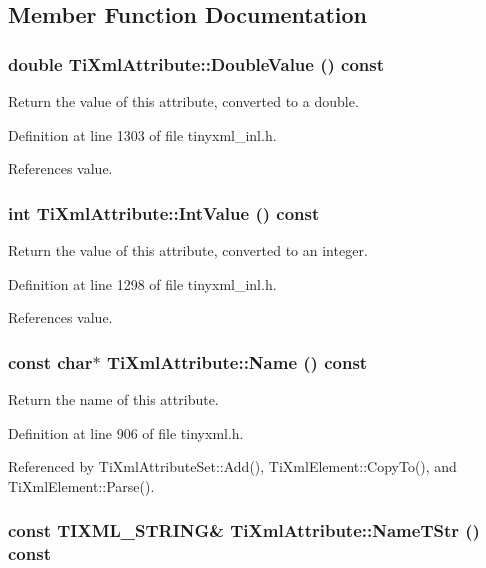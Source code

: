 \subsection{Member Function Documentation}
\hypertarget{class_ti_xml_attribute_a2880ddef53fc7522c99535273954d230}{
\subsubsection[{DoubleValue}]{\setlength{\rightskip}{0pt plus 5cm}double TiXmlAttribute::DoubleValue () const}}
\label{class_ti_xml_attribute_a2880ddef53fc7522c99535273954d230}


Return the value of this attribute, converted to a double. 

Definition at line 1303 of file tinyxml\_\-inl.h.

References value.\hypertarget{class_ti_xml_attribute_aa1a20ad59dc7e89a0ab265396360d50f}{
\subsubsection[{IntValue}]{\setlength{\rightskip}{0pt plus 5cm}int TiXmlAttribute::IntValue () const}}
\label{class_ti_xml_attribute_aa1a20ad59dc7e89a0ab265396360d50f}


Return the value of this attribute, converted to an integer. 

Definition at line 1298 of file tinyxml\_\-inl.h.

References value.\hypertarget{class_ti_xml_attribute_a298a57287d305904ba6bd96ae6f78d3d}{
\subsubsection[{Name}]{\setlength{\rightskip}{0pt plus 5cm}const char$\ast$ TiXmlAttribute::Name () const}}
\label{class_ti_xml_attribute_a298a57287d305904ba6bd96ae6f78d3d}


Return the name of this attribute. 

Definition at line 906 of file tinyxml.h.

Referenced by TiXmlAttributeSet::Add(), TiXmlElement::CopyTo(), and TiXmlElement::Parse().\hypertarget{class_ti_xml_attribute_a64cee17bceb8232eb0736d26dd082d79}{
\subsubsection[{NameTStr}]{\setlength{\rightskip}{0pt plus 5cm}const TIXML\_\-STRING\& TiXmlAttribute::NameTStr () const}}
\label{class_ti_xml_attribute_a64cee17bceb8232eb0736d26dd082d79}


